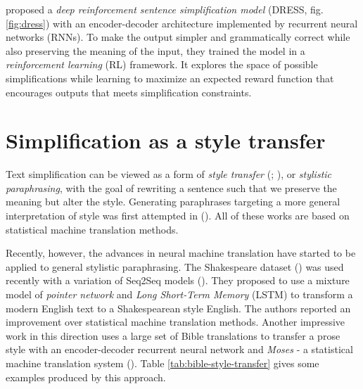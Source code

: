 \cite{zhang-lapata-2017-sentence} proposed a \emph{deep reinforcement sentence simplification model} (DRESS, fig. \ref{fig:dress}) with an encoder-decoder architecture implemented by recurrent neural networks (RNNs). To make the output simpler and grammatically correct while also preserving the meaning of the input, they trained the model in a \emph{reinforcement learning} (RL) framework. It explores the space of possible simplifications while learning to maximize an expected reward function that encourages outputs that meets simplification constraints.

\section{Simplification as a style transfer}

Text simplification can be viewed as a form of \emph{style transfer} (\cite{wubben-etal-2012-sentence}; \cite{sulem-semantic-evaluation}), or \emph{stylistic paraphrasing}, with the goal of rewriting a sentence such that we preserve the meaning but alter the style. Generating paraphrases targeting a more general interpretation of style was first attempted in (\cite{xu-etal-2012-paraphrasing}). All of these works are based on statistical machine translation methods. 

Recently, however, the advances in neural machine translation have started to be applied to general stylistic paraphrasing. The Shakespeare dataset (\cite{xu-etal-2012-paraphrasing}) was used recently with a variation of Seq2Seq models (\cite{jhamtani-etal-2017-shakespearizing}). They proposed to use a mixture model of \emph{pointer network} and \emph{Long Short-Term Memory} (LSTM) to transform a modern English text to a Shakespearean style English. The authors reported an improvement over statistical machine translation methods. Another impressive work in this direction uses a large set of Bible translations to transfer a prose style with an encoder-decoder recurrent neural network and \emph{Moses} - a statistical machine translation system (\cite{carlson-bible}). Table \ref{tab:bible-style-transfer} gives some examples produced by this approach. 

